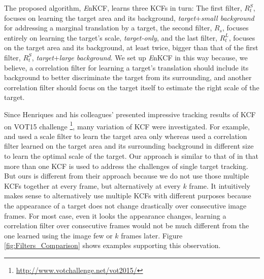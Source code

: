 \documentclass[10pt,twocolumn,letterpaper]{article}
\begin{document}
The proposed algorithm, {\it E}nKCF, learns three KCFs in turn: The
first filter, $R_{t}^{S}$, focuses on learning the target area and its
background, \textit{target}+\textit{small background} for addressing a
marginal translation by a target, the second filter, $R_{s}$, focuses
entirely on learning the target's scale, \textit{target-only}, and the
last filter, $R_{t}^{L}$, focuses on the target area and its
background, at least twice, bigger than that of the first filter,
$R_{t}^{S}$, \textit{target}+\textit{large background}. We set up {\it
  E}nKCF in this way because, we believe, a correlation filter for
learning a target's translation should include its background to
better discriminate the target from its surrounding, and another
correlation filter should focus on the target itself to estimate the
right scale of the target. 

Since Henriques and his colleagues' presented impressive tracking
results of KCF \cite{henriques2015high} on VOT15
challenge \footnote{\url{http://www.votchallenge.net/vot2015/}}, many
variation of KCF were investigated. For example, \cite{ma2015long} and
\cite{danelljan2014accurate} used a scale filter to learn the target
area only whereas \cite{li2014scale, bibi2015multi, tang2015multi}
used a correlation filter learned on the target area and its
surrounding background in different size to learn the optimal scale of
the target. Our approach is similar to that of \cite{ma2015long} in
that more than one KCF is used to address the challenges of single
target tracking. But ours is different from their approach because we
do not use those multiple KCFs together at every frame, but
alternatively at every $k$ frame. It intuitively makes sense to
alternatively use multiple KCFs with different purposes because the
appearance of a target does not change drastically over consecutive
image frames. For most case, even it looks the appearance changes,
learning a correlation filter over consecutive frames would not be
much different from the one learned using the image few or $k$ frames
later. Figure \ref{fig:Filters_Comparison} shows examples supporting
this observation.
\end{document}
